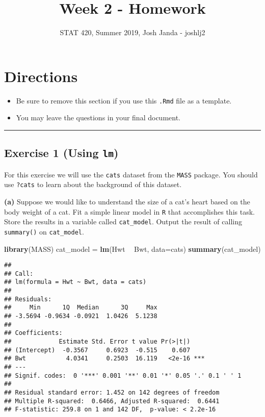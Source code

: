 \documentclass[]{article}
\title{Week 2 - Homework}
\author{STAT 420, Summer 2019, Josh Janda - joshlj2}
\date{}
\newenvironment{Shaded}{\begin{snugshade}}{\end{snugshade}}
\newcommand{\KeywordTok}[1]{\textcolor[rgb]{0.13,0.29,0.53}{\textbf{#1}}}
\newcommand{\DataTypeTok}[1]{\textcolor[rgb]{0.13,0.29,0.53}{#1}}
\newcommand{\StringTok}[1]{\textcolor[rgb]{0.31,0.60,0.02}{#1}}
\newcommand{\OperatorTok}[1]{\textcolor[rgb]{0.81,0.36,0.00}{\textbf{#1}}}
\newcommand{\NormalTok}[1]{#1}
\providecommand{\tightlist}{%
  \setlength{\itemsep}{0pt}\setlength{\parskip}{0pt}}
\begin{document}
\maketitle

\section{Directions}\label{directions}

\begin{itemize}
\tightlist
\item
  Be sure to remove this section if you use this \texttt{.Rmd} file as a
  template.
\item
  You may leave the questions in your final document.
\end{itemize}

\begin{center}\rule{0.5\linewidth}{\linethickness}\end{center}

\subsection{\texorpdfstring{Exercise 1 (Using
\texttt{lm})}{Exercise 1 (Using lm)}}\label{exercise-1-using-lm}

For this exercise we will use the \texttt{cats} dataset from the
\texttt{MASS} package. You should use \texttt{?cats} to learn about the
background of this dataset.

\textbf{(a)} Suppose we would like to understand the size of a cat's
heart based on the body weight of a cat. Fit a simple linear model in
\texttt{R} that accomplishes this task. Store the results in a variable
called \texttt{cat\_model}. Output the result of calling
\texttt{summary()} on \texttt{cat\_model}.

\begin{Shaded}
\begin{Highlighting}[]
\KeywordTok{library}\NormalTok{(MASS)}
\NormalTok{cat_model =}\StringTok{ }\KeywordTok{lm}\NormalTok{(Hwt }\OperatorTok{~}\StringTok{ }\NormalTok{Bwt, }\DataTypeTok{data=}\NormalTok{cats)}
\KeywordTok{summary}\NormalTok{(cat_model)}
\end{Highlighting}
\end{Shaded}

\begin{verbatim}
## 
## Call:
## lm(formula = Hwt ~ Bwt, data = cats)
## 
## Residuals:
##     Min      1Q  Median      3Q     Max 
## -3.5694 -0.9634 -0.0921  1.0426  5.1238 
## 
## Coefficients:
##             Estimate Std. Error t value Pr(>|t|)    
## (Intercept)  -0.3567     0.6923  -0.515    0.607    
## Bwt           4.0341     0.2503  16.119   <2e-16 ***
## ---
## Signif. codes:  0 '***' 0.001 '**' 0.01 '*' 0.05 '.' 0.1 ' ' 1
## 
## Residual standard error: 1.452 on 142 degrees of freedom
## Multiple R-squared:  0.6466, Adjusted R-squared:  0.6441 
## F-statistic: 259.8 on 1 and 142 DF,  p-value: < 2.2e-16
\end{verbatim}
\end{document}
